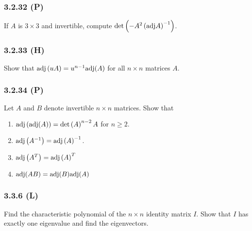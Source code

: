 \documentclass[pdf,9pt,t]{beamer}
\begin{document}
\begin{frame}[fragile]
    \frametitle{3.2.32 (P)}
    \begin{problem}
	If $A$ is $3\times 3$ and invertible, compute $\det\left(-A^2\left(\mbox{adj} A\right)^{-1}\right)$.
    \end{problem}
\end{frame}

\begin{frame}[fragile]
    \frametitle{3.2.33 (H)}
    \begin{problem}
	Show that $\mbox{adj}\left(uA\right) = u^{n-1}\mbox{adj}(A)$ for all $n \times n$
	matrices $A$.
    \end{problem}
\end{frame}

\begin{frame}[fragile]
   \frametitle{3.2.34 (P)}
   \begin{problem}
    Let $A$ and $B$ denote invertible $n \times n$ matrices. Show that
    \begin{enumerate}
	\item $\mbox{adj} \left(\mbox{adj} (A)\right)=\det\left(A\right)^{n-2}A$ for $n\ge 2$.
	\item $\mbox{adj}\left(A^{-1}\right) = \mbox{adj} \left(A\right)^{-1}$.
	\item $\mbox{adj}\left(A^T\right)=\mbox{adj} \left(A\right)^T$
	\item $\mbox{adj}(A B) = \mbox{adj}(B) \mbox{adj}(A)$
    \end{enumerate}
   \end{problem}
\end{frame}

\begin{frame}[fragile]
    \frametitle{3.3.6 (L)}
    \begin{problem}
	Find the characteristic polynomial of the $n \times n$ identity matrix $I$.
	Show that $I$ has exactly one eigenvalue and find the eigenvectors.
    \end{problem}
\end{frame}
\end{document}

